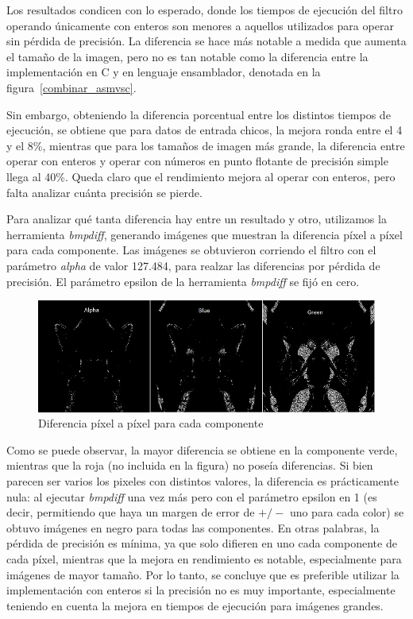 \documentclass[a4paper]{article}
\begin{document}
Los resultados condicen con lo esperado, donde los tiempos de ejecución del filtro operando únicamente con enteros son menores a aquellos utilizados para operar sin pérdida de precisión. La diferencia se hace más notable a medida que aumenta el tamaño de la imagen, pero no es tan notable como la diferencia entre la implementación en C y en lenguaje ensamblador, denotada en la figura~\ref{combinar_asmvsc}.

Sin embargo, obteniendo la diferencia porcentual entre los distintos tiempos de ejecución, se obtiene que para datos de entrada chicos, la mejora ronda entre el 4 y el 8\%, mientras que para los tamaños de imagen más grande, la diferencia entre operar con enteros y operar con números en punto flotante de precisión simple llega al 40\%. Queda claro que el rendimiento mejora al operar con enteros, pero falta analizar cuánta precisión se pierde.
\bigskip

Para analizar qué tanta diferencia hay entre un resultado y otro, utilizamos la herramienta \textit{bmpdiff}, generando imágenes que muestran la diferencia píxel a píxel para cada componente. Las imágenes se obtuvieron corriendo el filtro con el parámetro \textit{alpha} de valor 127.484, para realzar las diferencias por pérdida de precisión. El parámetro epsilon de la herramienta \textit{bmpdiff} se fijó en cero.
\\
\begin{figure}[H]
  \begin{center}
	\includegraphics[scale=0.66]{imagenes/diffExp.jpg}
	\caption{Diferencia píxel a píxel para cada componente}
	\label{combinar_diff}
  \end{center}
\end{figure}

Como se puede observar, la mayor diferencia se obtiene en la componente verde, mientras que la roja (no incluida en la figura) no poseía diferencias. Si bien parecen ser varios los pixeles con distintos valores, la diferencia es prácticamente nula: al ejecutar \textit{bmpdiff} una vez más pero con el parámetro epsilon en 1 (es decir, permitiendo que haya un margen de error de $+/-$ uno para cada color) se obtuvo imágenes en negro para todas las componentes. En otras palabras, la pérdida de precisión es mínima, ya que solo difieren en uno cada componente de cada píxel, mientras que la mejora en rendimiento es notable, especialmente para imágenes de mayor tamaño. Por lo tanto, se concluye que es preferible utilizar la implementación con enteros si la precisión no es muy importante, especialmente teniendo en cuenta la mejora en tiempos de ejecución para imágenes grandes.
\end{document}
